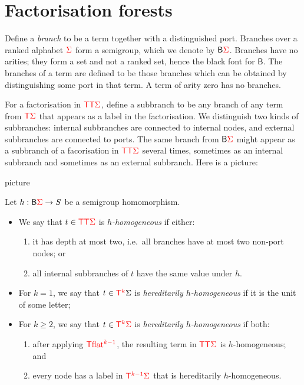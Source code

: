 \section{Factorisation forests}

\newcommand{\branches}{\mathsf{B}}
Define a \emph{branch} to be a term together with a distinguished port. Branches over a  ranked alphabet ${\color{red}{\Sigma}}$ form a semigroup, which we denote by $\branches \rSigma$. Branches have no arities; they form a set and not a ranked set, hence the black font for $\branches$. The branches of a term are defined to be those branches which can be obtained by distinguishing some port in that term. A term of arity zero has no branches. 

For a factorisation in ${\color{red}{\mathsf T}} {\color{red}{\mathsf T}} {\color{red}{\Sigma}}$, define a subbranch to be any branch of any term from ${\color{red}{\mathsf T}} {\color{red}{\Sigma}}$ that appears as a label in the factorisation. We distinguish two kinds of subbranches: internal subbranches are connected to internal nodes, and external subbranches are connected to ports. The same branch from $\branches \rSigma$  might appear as a subbranch of a facorisation in ${\color{red}{\mathsf T}} {\color{red}{\mathsf T}} {\color{red}{\Sigma}}$ several times, sometimes as an internal subbranch and sometimes as an external subbranch.
Here is a picture:
\begin{center}
    picture
\end{center}

\begin{definition}
    Let $h : \branches \rSigma \to S$ be a semigroup homomorphism.
    \begin{itemize}
\item     We say that $t \in {\color{red}{\mathsf T}} {\color{red}{\mathsf T}} {\color{red}{\Sigma}}$ is \emph{$h$-homogeneous} if either:
\begin{enumerate}
    \item  it has depth at most two, i.e.~all branches have at most two non-port nodes; or
    \item  all internal subbranches of $t$ have the same value under $h$.
\end{enumerate}        
\item For $k = 1$, we say that $t \in {\color{red}{\mathsf T}}^{{\color{red}{k}}} \Sigma$ is \emph{hereditarily $h$-homogeneous} if it is the unit of some letter;
\item For $k \ge  2$, we say that $t \in {\color{red}{\mathsf T}}^{{\color{red}{k}}}  {\color{red}{\Sigma}}$ is \emph{hereditarily $h$-homogeneous} if both:
\begin{enumerate}
    \item  after applying ${\color{red}{\mathsf T}} {\color{red}{\mathrm{flat}}}^{{\color{red}{k-1}}}$,   the resulting term in ${\color{red}{\mathsf T}} {\color{red}{\mathsf T}} {\color{red}{\Sigma}}$ is $h$-homogeneous; and 
    \item every node has a label in ${\color{red}{\mathsf T}}^{{\color{red}{k-1}}} {\color{red}{\Sigma}}$ that is hereditarily $h$-homogeneous. 
\end{enumerate}
    \end{itemize}
\end{definition}


